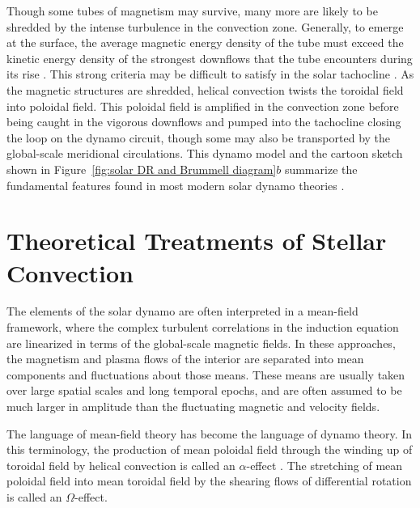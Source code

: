 Though some tubes of magnetism may survive, many more are likely to be shredded by
the intense turbulence in the convection zone.  Generally, to emerge
at the surface, the average magnetic energy density of the tube must exceed
the kinetic energy density of the strongest downflows that the tube encounters
during its rise \citep[e.g.,][]{Cline_thesis,Fan_et_al_2003,Abbett_et_al_2004,Jouve&Brun_2009}.  
This strong criteria may be difficult to satisfy in the solar tachocline
\citep{Vasil&Brummell_2008,Vasil&Brummell_2009}.
As the magnetic structures are shredded, helical
convection twists the toroidal field into poloidal field. 
This poloidal field is amplified in the convection zone before being
caught in the vigorous downflows and pumped into the tachocline
closing the loop on the dynamo circuit, though some may also be
transported by the global-scale meridional circulations.  This dynamo
model and the cartoon sketch shown in Figure~\ref{fig:solar DR and Brummell diagram}$b$
summarize the fundamental features found in most modern solar dynamo
theories \citep[e.g.,][]{Charbonneau_2005, Miesch_2005}.


\section{Theoretical Treatments of Stellar Convection}
The elements of the solar dynamo are often interpreted in a mean-field
framework, where the complex turbulent correlations in the induction
equation are linearized in terms of the global-scale magnetic fields.
In these approaches, the magnetism and plasma flows of the interior
are separated into mean components and fluctuations about those
means.  These means are usually taken over large spatial scales and long
temporal epochs, and are often assumed to be much larger in amplitude
than the fluctuating magnetic and velocity fields.

The language of mean-field theory has become the language of dynamo
theory.  In this terminology, the production of mean poloidal field
through the winding up of toroidal field by helical convection is
called an $\alpha$-effect \citep[e.g.,][]{Moffatt_1978, Steenbeck_et_al_1966}. 
The stretching of mean poloidal field into mean toroidal field by the
shearing flows of differential rotation is called an $\Omega$-effect.


